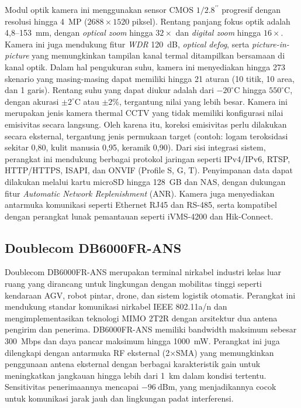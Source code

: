 Modul optik kamera ini menggunakan sensor CMOS \(1/2.8^{\prime\prime}\) progresif dengan resolusi hingga 4~MP (\(2688 \times 1520\) piksel). Rentang panjang fokus optik adalah 4{,}8--153~mm, dengan \emph{optical zoom} hingga \(32 \times\) dan \emph{digital zoom} hingga \(16 \times\). Kamera ini juga mendukung fitur \emph{WDR} 120~dB, \emph{optical defog}, serta \emph{picture-in-picture} yang memungkinkan tampilan kanal termal ditampilkan bersamaan di kanal optik. Dalam hal pengukuran suhu, kamera ini menyediakan hingga 273 skenario yang masing-masing dapat memiliki hingga 21 aturan (10 titik, 10 area, dan 1 garis). Rentang suhu yang dapat diukur adalah dari \(-20^\circ\text{C}\) hingga \(550^\circ\text{C}\), dengan akurasi \(\pm 2^\circ\text{C}\) atau \(\pm 2\%\), tergantung nilai yang lebih besar. Kamera ini merupakan jenis kamera thermal CCTV yang tidak memiliki konfigurasi nilai emisivitas secara langsung. Oleh karena itu, koreksi emisivitas perlu dilakukan secara eksternal, tergantung jenis permukaan target (contoh: logam teroksidasi sekitar 0{,}80, kulit manusia 0{,}95, keramik 0{,}90). Dari sisi integrasi sistem, perangkat ini mendukung berbagai protokol jaringan seperti IPv4/IPv6, RTSP, HTTP/HTTPS, ISAPI, dan ONVIF (Profile S, G, T). Penyimpanan data dapat dilakukan melalui kartu microSD hingga 128~GB dan NAS, dengan dukungan fitur \emph{Automatic Network Replenishment} (ANR). Kamera juga menyediakan antarmuka komunikasi seperti Ethernet RJ45 dan RS-485, serta kompatibel dengan perangkat lunak pemantauan seperti iVMS-4200 dan Hik-Connect.


\subsection{Doublecom DB6000FR-ANS}

Doublecom DB6000FR-ANS merupakan terminal nirkabel industri kelas luar ruang yang dirancang untuk lingkungan dengan mobilitas tinggi seperti kendaraan AGV, robot pintar, drone, dan sistem logistik otomatis. Perangkat ini mendukung standar komunikasi nirkabel IEEE 802.11a/n dan mengimplementasikan teknologi MIMO 2T2R dengan arsitektur dua antena pengirim dan penerima. DB6000FR-ANS memiliki bandwidth maksimum sebesar 300~Mbps dan daya pancar maksimum hingga 1000~mW. Perangkat ini juga dilengkapi dengan antarmuka RF eksternal (2×SMA) yang memungkinkan penggunaan antena eksternal dengan berbagai karakteristik gain untuk meningkatkan jangkauan hingga lebih dari 1~km dalam kondisi tertentu. Sensitivitas penerimaannya mencapai \(-96~\text{dBm}\), yang menjadikannya cocok untuk komunikasi jarak jauh dan lingkungan padat interferensi.

